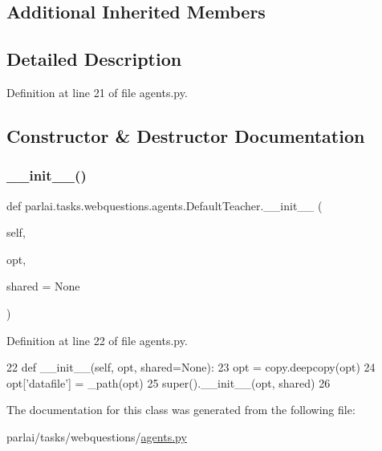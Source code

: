 \subsection*{Additional Inherited Members}


\subsection{Detailed Description}


Definition at line 21 of file agents.\+py.



\subsection{Constructor \& Destructor Documentation}
\mbox{\label{classparlai_1_1tasks_1_1webquestions_1_1agents_1_1DefaultTeacher_a5206081c0932010aa0cb6ac15eb51ed1}} 
\subsubsection{\texorpdfstring{\+\_\+\+\_\+init\+\_\+\+\_\+()}{\_\_init\_\_()}}
{\footnotesize\ttfamily def parlai.\+tasks.\+webquestions.\+agents.\+Default\+Teacher.\+\_\+\+\_\+init\+\_\+\+\_\+ (\begin{DoxyParamCaption}\item[{}]{self,  }\item[{}]{opt,  }\item[{}]{shared = {\ttfamily None} }\end{DoxyParamCaption})}



Definition at line 22 of file agents.\+py.


\begin{DoxyCode}
22     \textcolor{keyword}{def }\_\_init\_\_(self, opt, shared=None):
23         opt = copy.deepcopy(opt)
24         opt[\textcolor{stringliteral}{'datafile'}] = \_path(opt)
25         super().\_\_init\_\_(opt, shared)
26 \end{DoxyCode}


The documentation for this class was generated from the following file\+:\begin{DoxyCompactItemize}
\item 
parlai/tasks/webquestions/\hyperlink{parlai_2tasks_2webquestions_2agents_8py}{agents.\+py}\end{DoxyCompactItemize}
